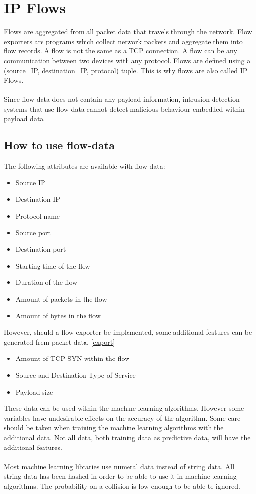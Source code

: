
\chapter{IP Flows} %

\label{flow} %

\label{export}
Flows are aggregated from all packet data that travels through the network. Flow exporters are programs which collect network packets and aggregate them into flow records. A flow is not the same as a TCP connection. A flow can be any communication between two devices with any protocol. Flows are defined using a (source\_IP, destination\_IP, protocol) tuple. This is why flows are also called IP Flows.\\
\\
Since flow data does not contain any payload information, intrusion detection systems that use flow data cannot detect malicious behaviour embedded within payload data. \cite{IPFlow}

\section{How to use flow-data}
The following attributes are available with flow-data:
\begin{itemize}
\item Source IP
\item Destination IP
\item Protocol name
\item Source port
\item Destination port
\item Starting time of the flow
\item Duration of the flow
\item Amount of packets in the flow
\item Amount of bytes in the flow
\end{itemize}
However, should a flow exporter be implemented, some additional features can be generated from packet data. \ref{export}
\begin{itemize}
\item Amount of TCP SYN within the flow
\item Source and Destination Type of Service
\item Payload size
\end{itemize}
These data can be used within the machine learning algorithms. However some variables have undesirable effects on the accuracy of the algorithm. Some care should be taken when training the machine learning algorithms with the additional data. Not all data, both training data as predictive data, will have the additional features.\\
\\
Most machine learning libraries use numeral data instead of string data. All string data has been hashed in order to be able to use it in machine learning algorithms. The probability on a collision is low enough to be able to ignored.


